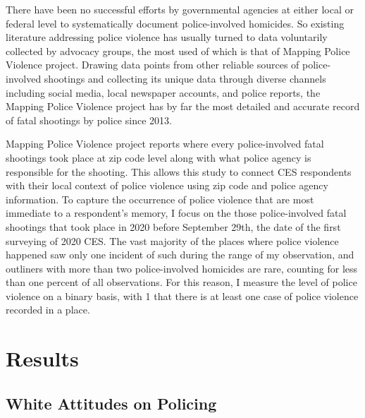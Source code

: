 \documentclass[
  12pt,
]{article}
\begin{document}
There have been no successful efforts by governmental agencies at either
local or federal level to systematically document police-involved
homicides. So existing literature addressing police violence has usually
turned to data voluntarily collected by advocacy groups, the most used
of which is that of Mapping Police Violence project. Drawing data points
from other reliable sources of police-involved shootings and collecting
its unique data through diverse channels including social media, local
newspaper accounts, and police reports, the Mapping Police Violence
project has by far the most detailed and accurate record of fatal
shootings by police since 2013.

Mapping Police Violence project reports where every police-involved
fatal shootings took place at zip code level along with what police
agency is responsible for the shooting. This allows this study to
connect CES respondents with their local context of police violence
using zip code and police agency information. To capture the occurrence
of police violence that are most immediate to a respondent's memory, I
focus on the those police-involved fatal shootings that took place in
2020 before September 29th, the date of the first surveying of 2020 CES.
The vast majority of the places where police violence happened saw only
one incident of such during the range of my observation, and outliners
with more than two police-involved homicides are rare, counting for less
than one percent of all observations. For this reason, I measure the
level of police violence on a binary basis, with 1 that there is at
least one case of police violence recorded in a place.

\hypertarget{results}{%
\section{Results}\label{results}}

\hypertarget{white-attitudes-on-policing}{%
\subsection{White Attitudes on
Policing}\label{white-attitudes-on-policing}}
\end{document}
